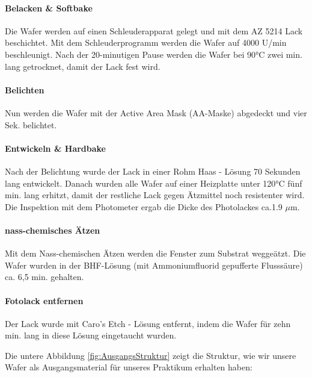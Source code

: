 \paragraph[Belacken \& Softbake]{Belacken \& Softbake}

Die  Wafer werden auf einen Schleuderapparat gelegt und mit dem AZ 5214  Lack beschichtet. Mit dem Schleuderprogramm werden die Wafer auf 4000 U/min beschleunigt.
Nach der 20-minutigen Pause werden die Wafer bei 90°C zwei min. lang getrocknet, damit der Lack fest wird.



\paragraph[Belichten]{Belichten}
Nun werden die Wafer mit der Active Area Mask  (AA-Maske) abgedeckt und vier Sek. belichtet.


\paragraph[Entwickeln \& Hardbake]{Entwickeln \& Hardbake}

Nach der Belichtung wurde  der Lack in einer Rohm Haas - Lösung 70 Sekunden lang
entwickelt.
Danach wurden alle Wafer auf einer Heizplatte unter 120°C fünf min. lang erhitzt, damit der
restliche Lack gegen Ätzmittel noch resistenter wird.
Die Inspektion mit dem Photometer ergab die Dicke des Photolackes ca.1.9 $\mu$m.


\paragraph[nass-chemisches Ätzen]{nass-chemisches Ätzen}

Mit dem Nass-chemischen Ätzen  werden die Fenster zum Substrat weggeätzt.
Die Wafer wurden in der BHF-Lösung (mit Ammoniumfluorid gepufferte Flusssäure) ca. 6,5 min. gehalten.



\paragraph{Fotolack entfernen}

Der Lack wurde mit  Caro's Etch - Lösung entfernt, indem die Wafer für zehn min. lang in diese Lösung eingetaucht wurden.

Die  untere Abbildung \ref{fig:AusgangsStruktur} zeigt die Struktur, wie wir unsere Wafer als Ausgangsmaterial für unseres Praktikum erhalten haben:

